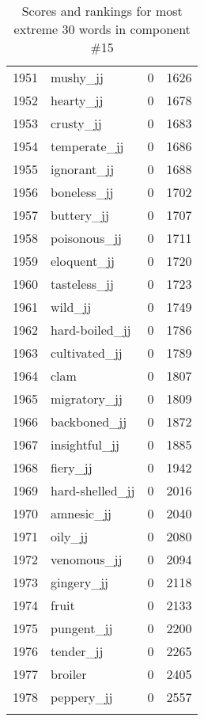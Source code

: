 \begin{longtable}[!htbp]{| rlr@{.}l |}
    1951 & mushy\_jj & 0 & 1626 \\
    1952 & hearty\_jj & 0 & 1678 \\
    1953 & crusty\_jj & 0 & 1683 \\
    1954 & temperate\_jj & 0 & 1686 \\
    1955 & ignorant\_jj & 0 & 1688 \\
    1956 & boneless\_jj & 0 & 1702 \\
    1957 & buttery\_jj & 0 & 1707 \\
    1958 & poisonous\_jj & 0 & 1711 \\
    1959 & eloquent\_jj & 0 & 1720 \\
    1960 & tasteless\_jj & 0 & 1723 \\
    1961 & wild\_jj & 0 & 1749 \\
    1962 & hard-boiled\_jj & 0 & 1786 \\
    1963 & cultivated\_jj & 0 & 1789 \\
    1964 & clam & 0 & 1807 \\
    1965 & migratory\_jj & 0 & 1809 \\
    1966 & backboned\_jj & 0 & 1872 \\
    1967 & insightful\_jj & 0 & 1885 \\
    1968 & fiery\_jj & 0 & 1942 \\
    1969 & hard-shelled\_jj & 0 & 2016 \\
    1970 & amnesic\_jj & 0 & 2040 \\
    1971 & oily\_jj & 0 & 2080 \\
    1972 & venomous\_jj & 0 & 2094 \\
    1973 & gingery\_jj & 0 & 2118 \\
    1974 & fruit & 0 & 2133 \\
    1975 & pungent\_jj & 0 & 2200 \\
    1976 & tender\_jj & 0 & 2265 \\
    1977 & broiler & 0 & 2405 \\
    1978 & peppery\_jj & 0 & 2557 \\
    \hline
    \caption{Scores and rankings for most extreme 30 words in component \#15} \\
\end{longtable}
